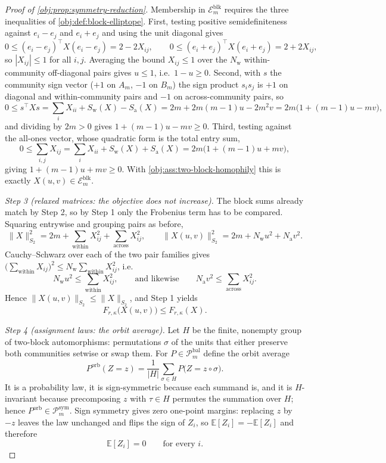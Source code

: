 \begin{proof}[Proof of \cref{obj:prop:symmetry-reduction}]
Membership in \(\mathcal E_m^{\mathrm{blk}}\) requires the three inequalities of \cref{obj:def:block-elliptope}.  First, testing positive semidefiniteness against \(e_i-e_j\) and \(e_i+e_j\) and using the unit diagonal gives
\[
0\le(e_i-e_j)^\top X(e_i-e_j)=2-2X_{ij},
\qquad
0\le(e_i+e_j)^\top X(e_i+e_j)=2+2X_{ij},
\]
so \(|X_{ij}|\le1\) for all \(i,j\). %
Averaging the bound \(X_{ij}\le1\) over the \(N_{\mathrm{w}}\) within-community off-diagonal pairs gives \(u\le1\), i.e.\ \(1-u\ge0\).  Second, with \(s\) the community sign vector (\(+1\) on \(A_m\), \(-1\) on \(B_m\)) the sign product \(s_is_j\) is \(+1\) on diagonal and within-community pairs and \(-1\) on across-community pairs, so
\[
0\le s^\top Xs=\sum_iX_{ii}+S_{\mathrm{w}}(X)-S_{\mathrm{a}}(X)
=2m+2m(m-1)u-2m^2v
=2m\bigl(1+(m-1)u-mv\bigr),
\]
and dividing by \(2m>0\) gives \(1+(m-1)u-mv\ge0\).  Third, testing against the all-ones vector, whose quadratic form is the total entry sum,
\[
0\le\sum_{i,j}X_{ij}=\sum_iX_{ii}+S_{\mathrm{w}}(X)+S_{\mathrm{a}}(X)
=2m\bigl(1+(m-1)u+mv\bigr),
\]
giving \(1+(m-1)u+mv\ge0\).  With \cref{obj:ass:two-block-homophily} this is exactly \(X(u,v)\in\mathcal E_m^{\mathrm{blk}}\). %

\emph{Step 3 (relaxed matrices: the objective does not increase).}  The block sums already match by Step 2, so by Step 1 only the Frobenius term has to be compared.  Squaring entrywise and grouping pairs as before,
\[
\|X\|_{S_2}^2=2m+\sum_{\text{within}}X_{ij}^2+\sum_{\text{across}}X_{ij}^2,
\qquad
\|X(u,v)\|_{S_2}^2=2m+N_{\mathrm{w}}u^2+N_{\mathrm{a}}v^2 .
\]
Cauchy--Schwarz over each of the two pair families gives \(\bigl(\sum_{\text{within}}X_{ij}\bigr)^2\le N_{\mathrm{w}}\sum_{\text{within}}X_{ij}^2\), i.e.
\[
N_{\mathrm{w}}u^2\le\sum_{\text{within}}X_{ij}^2,
\qquad\text{and likewise}\qquad
N_{\mathrm{a}}v^2\le\sum_{\text{across}}X_{ij}^2 .
\]
Hence \(\|X(u,v)\|_{S_2}\le\|X\|_{S_2}\), %
and Step 1 yields
\[
F_{r,\kappa}\bigl(X(u,v)\bigr)\le F_{r,\kappa}(X).
\]

\emph{Step 4 (assignment laws: the orbit average).}  Let \(H\) be the finite, nonempty group of two-block automorphisms: permutations \(\sigma\) of the units that either preserve both communities setwise or swap them.  For \(P\in\mathcal P_m^{\mathrm{bal}}\) define the orbit average
\[
P^{\mathrm{orb}}(Z=z)=\frac{1}{|H|}\sum_{\sigma\in H}P\bigl(Z=z\circ\sigma\bigr).
\]
It is a probability law, it is sign-symmetric because each summand is, and it is \(H\)-invariant because precomposing \(z\) with \(\tau\in H\) permutes the summation over \(H\); hence \(P^{\mathrm{orb}}\in\mathcal P_m^{\mathrm{sym}}\). %
Sign symmetry gives zero one-point margins: replacing \(z\) by \(-z\) leaves the law unchanged and flips the sign of \(Z_i\), so \(\mathbb E[Z_i]=-\mathbb E[Z_i]\) and therefore
\[
\mathbb E[Z_i]=0
\qquad\text{for every }i .
\]


\end{proof}
